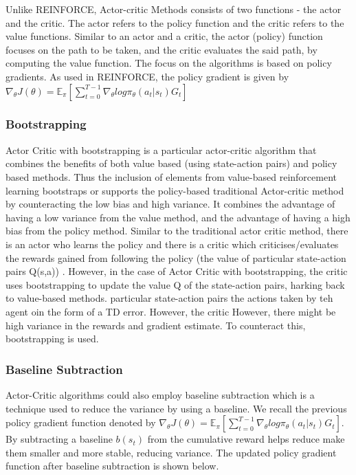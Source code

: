 \documentclass{article}
\begin{document}
Unlike REINFORCE, Actor-critic Methods consists of two functions - the actor and the critic. The actor refers to the policy function and the critic refers to the value functions. Similar to an actor and a critic, the actor (policy) function focuses on the path to be taken, and the critic evaluates the said path, by computing the value function. 
The focus on the algorithms is based on policy gradients. \cite{actor-critic}
\newline As used in REINFORCE, the policy gradient is given by 
\newline 
$\nabla_\theta J(\theta) = \mathbb{E}_\pi[\sum _{t=0}^{T-1} \nabla_\theta log\pi_\theta (a_t|s_t)G_t]$
\subsubsection{Bootstrapping}
Actor Critic with bootstrapping is a particular actor-critic algorithm that combines the benefits of both value based (using state-action pairs) and policy based methods. Thus the inclusion of elements from value-based reinforcement learning bootstraps or supports the policy-based traditional Actor-critic method by counteracting the low bias and high variance. It combines the advantage of having a low variance from the value method, and the advantage of having a high bias from the policy method.
Similar to the traditional actor critic method, there is an actor who learns the policy and there is a critic which criticises/evaluates the rewards gained from following the policy (the value of particular state-action pairs Q(s,a)) . However, in the case of Actor Critic with bootstrapping, the critic uses bootstrapping to update the value Q of the state-action pairs, harking back to value-based methods. \newline 
particular state-action pairs  the actions taken by teh agent oin the form of a TD error. However, the critic 
However, there might be high variance in the rewards and gradient estimate. To counteract this, bootstrapping is used. 

\subsubsection{Baseline Subtraction}
Actor-Critic algorithms could also employ baseline subtraction which is a technique used to reduce the variance by using a baseline. We recall the previous policy gradient function denoted by $\nabla_\theta J(\theta) = \mathbb{E}_\pi[\sum _{t=0}^{T-1} \nabla_\theta log\pi_\theta (a_t|s_t)G_t]$. By subtracting a baseline $b(s_t)$ from the cumulative reward helps reduce make them smaller and more stable, reducing variance. The updated policy gradient function after baseline subtraction is shown below. 
\end{document}
